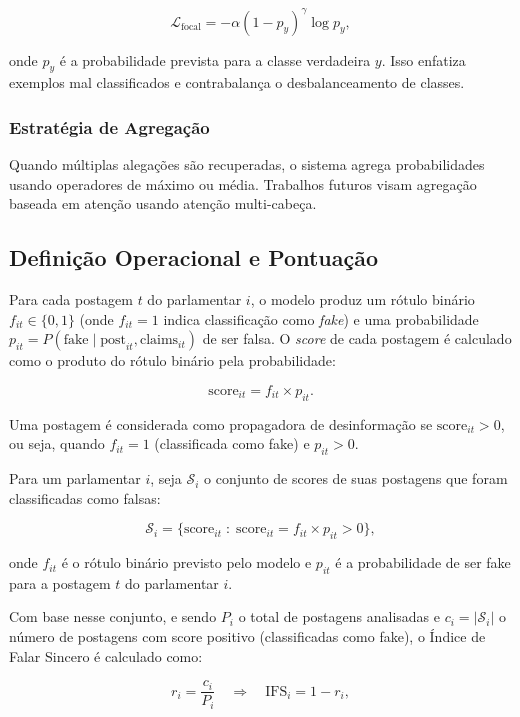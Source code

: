 \begin{equation}
    \mathcal{L}_{\text{focal}} = - \alpha (1 - p_y)^{\gamma} \log p_y,
\end{equation}

onde $p_y$ é a probabilidade prevista para a classe verdadeira $y$. Isso enfatiza exemplos mal classificados e contrabalança o desbalanceamento de classes.

\subsubsection{Estratégia de Agregação}

Quando múltiplas alegações são recuperadas, o sistema agrega probabilidades usando operadores de máximo ou média. Trabalhos futuros visam agregação baseada em atenção usando atenção multi-cabeça.


\subsection{Definição Operacional e Pontuação}

Para cada postagem $t$ do parlamentar $i$, o modelo produz um rótulo binário $f_{it} \in \{0, 1\}$ (onde $f_{it} = 1$ indica classificação como \textit{fake}) e uma probabilidade $p_{it} = P(\text{fake} \mid \text{post}_{it}, \text{claims}_{it})$ de ser falsa. O \textit{score} de cada postagem é calculado como o produto do rótulo binário pela probabilidade:

\[
    \text{score}_{it} = f_{it} \times p_{it}.
\]

Uma postagem é considerada como propagadora de desinformação se $\text{score}_{it} > 0$, ou seja, quando $f_{it} = 1$ (classificada como fake) e $p_{it} > 0$.

Para um parlamentar $i$, seja $\mathcal{S}_i$ o conjunto de scores de suas postagens que foram classificadas como falsas:

\[
    \mathcal{S}_i = \Big\{ \text{score}_{it} \;:\; \text{score}_{it} = f_{it} \times p_{it} > 0 \Big\},
\]

onde $f_{it}$ é o rótulo binário previsto pelo modelo e $p_{it}$ é a probabilidade de ser fake para a postagem $t$ do parlamentar $i$.

Com base nesse conjunto, e sendo $P_i$ o total de postagens analisadas e $c_i = |\mathcal{S}_i|$ o número de postagens com score positivo (classificadas como fake), o Índice de Falar Sincero é calculado como:

\[
    r_i = \frac{c_i}{P_i} \quad \Rightarrow \quad \mathrm{IFS}_i = 1 - r_i,
\]

